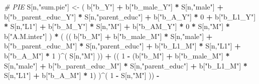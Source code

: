 \documentclass[
]{book}
\newenvironment{Shaded}{\begin{snugshade}}{\end{snugshade}}
\newcommand{\CommentTok}[1]{\textcolor[rgb]{0.56,0.35,0.01}{\textit{#1}}}
\newcommand{\DecValTok}[1]{\textcolor[rgb]{0.00,0.00,0.81}{#1}}
\newcommand{\NormalTok}[1]{#1}
\newcommand{\OtherTok}[1]{\textcolor[rgb]{0.56,0.35,0.01}{#1}}
\newcommand{\SpecialCharTok}[1]{\textcolor[rgb]{0.81,0.36,0.00}{\textbf{#1}}}
\newcommand{\StringTok}[1]{\textcolor[rgb]{0.31,0.60,0.02}{#1}}
\begin{document}
\begin{Shaded}
\begin{Highlighting}[]
    \CommentTok{\# PIE }
\NormalTok{    S[n,}\StringTok{"sum.pie"}\NormalTok{] }\OtherTok{\textless{}{-}}\NormalTok{ ( b[}\StringTok{"b\_Y"}\NormalTok{] }\SpecialCharTok{+} 
\NormalTok{                          b[}\StringTok{"b\_male\_Y"}\NormalTok{] }\SpecialCharTok{*}\NormalTok{ S[n,}\StringTok{"male"}\NormalTok{] }\SpecialCharTok{+} 
\NormalTok{                          b[}\StringTok{"b\_parent\_educ\_Y"}\NormalTok{] }\SpecialCharTok{*}\NormalTok{ S[n,}\StringTok{"parent\_educ"}\NormalTok{] }\SpecialCharTok{+} 
\NormalTok{                          b[}\StringTok{"b\_A\_Y"}\NormalTok{] }\SpecialCharTok{*} \DecValTok{0} \SpecialCharTok{+} 
\NormalTok{                          b[}\StringTok{"b\_L1\_Y"}\NormalTok{] }\SpecialCharTok{*}\NormalTok{ S[n,}\StringTok{"L1"}\NormalTok{] }\SpecialCharTok{+}
\NormalTok{                          b[}\StringTok{"b\_M\_Y"}\NormalTok{] }\SpecialCharTok{*}\NormalTok{ S[n,}\StringTok{"M"}\NormalTok{] }\SpecialCharTok{+}
\NormalTok{                          b[}\StringTok{"b\_AM\_Y"}\NormalTok{] }\SpecialCharTok{*} \DecValTok{0} \SpecialCharTok{*}\NormalTok{ S[n,}\StringTok{"M"}\NormalTok{] }\SpecialCharTok{*}\NormalTok{ b[}\StringTok{"A.M.inter"}\NormalTok{] ) }\SpecialCharTok{*}
\NormalTok{      ( (( b[}\StringTok{"b\_M"}\NormalTok{] }\SpecialCharTok{+} 
\NormalTok{             b[}\StringTok{"b\_male\_M"}\NormalTok{] }\SpecialCharTok{*}\NormalTok{ S[n,}\StringTok{"male"}\NormalTok{] }\SpecialCharTok{+} 
\NormalTok{             b[}\StringTok{"b\_parent\_educ\_M"}\NormalTok{] }\SpecialCharTok{*}\NormalTok{ S[n,}\StringTok{"parent\_educ"}\NormalTok{] }\SpecialCharTok{+} 
\NormalTok{             b[}\StringTok{"b\_L1\_M"}\NormalTok{] }\SpecialCharTok{*}\NormalTok{ S[n,}\StringTok{"L1"}\NormalTok{] }\SpecialCharTok{+}
\NormalTok{             b[}\StringTok{"b\_A\_M"}\NormalTok{] }\SpecialCharTok{*} \DecValTok{1}\NormalTok{ )}\SpecialCharTok{\^{}}\NormalTok{( S[n,}\StringTok{"M"}\NormalTok{] )) }\SpecialCharTok{+}
\NormalTok{          (( }\DecValTok{1} \SpecialCharTok{{-}}\NormalTok{ (b[}\StringTok{"b\_M"}\NormalTok{] }\SpecialCharTok{+} 
\NormalTok{                    b[}\StringTok{"b\_male\_M"}\NormalTok{] }\SpecialCharTok{*}\NormalTok{ S[n,}\StringTok{"male"}\NormalTok{] }\SpecialCharTok{+} 
\NormalTok{                    b[}\StringTok{"b\_parent\_educ\_M"}\NormalTok{] }\SpecialCharTok{*}\NormalTok{ S[n,}\StringTok{"parent\_educ"}\NormalTok{] }\SpecialCharTok{+} 
\NormalTok{                    b[}\StringTok{"b\_L1\_M"}\NormalTok{] }\SpecialCharTok{*}\NormalTok{ S[n,}\StringTok{"L1"}\NormalTok{] }\SpecialCharTok{+}
\NormalTok{                    b[}\StringTok{"b\_A\_M"}\NormalTok{] }\SpecialCharTok{*} \DecValTok{1}\NormalTok{) )}\SpecialCharTok{\^{}}\NormalTok{( }\DecValTok{1} \SpecialCharTok{{-}}\NormalTok{ S[n,}\StringTok{"M"}\NormalTok{] )) }\SpecialCharTok{{-}}

\end{Highlighting}
\end{Shaded}
\end{document}
